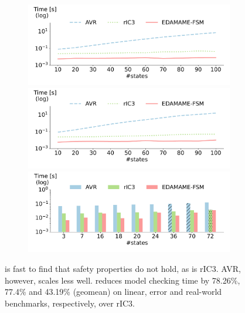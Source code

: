 \documentclass[acmsmall,screen,review]{acmart}
\begin{document}
\begin{figure}[t]
  \centering
  \begin{subfigure}{\columnwidth}
  \includegraphics[width=\columnwidth]{fsm-plots/safety-unsat_linear.pdf}
  \label{fig:benchmark-lin-s}
  \includegraphics[width=\columnwidth]{fsm-plots/safety-unsat_err.pdf}
  \label{fig:benchmark-err-s}
  \includegraphics[width=\columnwidth]{fsm-plots/safety-unsat_rw.pdf}
  \label{fig:benchmark-rw-s}
  \end{subfigure}
  \caption[]{\toolname{} is fast to find that safety properties do not hold, as is rIC3. AVR, however, scales less well. \toolname{} reduces model checking time by 78.26\%, 77.4\% and 43.19\% (geomean) on linear, error and real-world benchmarks, respectively, over rIC3.
  }\label{fig:safety-results-unsat}
\end{figure}
\end{document}
